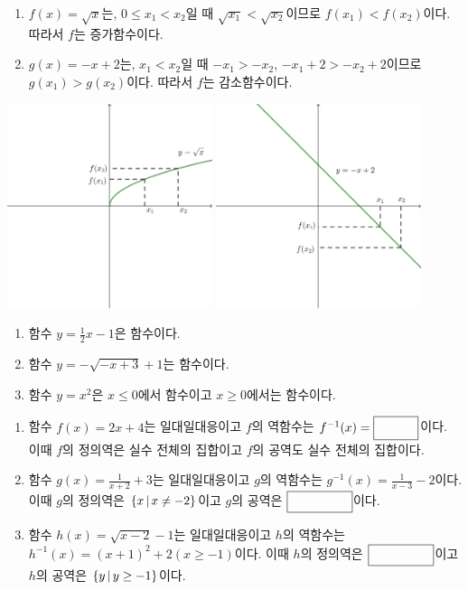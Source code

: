 \documentclass{oblivoir}
\begin{document}
%
\exam{}
\begin{enumerate}\label{review6}
\item
\(f(x)=\sqrt x\)는, \(0\le x_1<x_2\)일 때 \(\sqrt{x_1}<\sqrt{x_2}\)이므로 \(f(x_1)<f(x_2)\)이다.
따라서 \(f\)는 증가함수이다.
\item
\(g(x)=-x+2\)는, \(x_1<x_2\)일 때 \(-x_1>-x_2\), \(-x_1+2>-x_2+2\)이므로 \(g(x_1)>g(x_2)\)이다.
따라서 \(f\)는 감소함수이다.
\end{enumerate}
\begin{center}
\includegraphics[width=0.45\textwidth]{review_6-1}
\quad
\includegraphics[width=0.45\textwidth]{review_6-2}
\end{center}

%
\begin{enumerate}\label{review7}
\item
함수 \(y=\frac12x-1\)은 함수이다.
\item
함수 \(y=-\sqrt{-x+3}+1\)는 함수이다.
\item
함수 \(y=x^2\)은 \(x\le0\)에서 함수이고 \(x\ge0\)에서는 함수이다.
\end{enumerate}

\newpage
%
\begin{enumerate}\label{review8}
\item
함수 \(f(x)=2x+4\)는 일대일대응이고 \(f\)의 역함수는 \(f^{-1}(x)=\pb{\frac12x-2}\)이다.
이때 \(f\)의 정의역은 실수 전체의 집합이고 \(f\)의 공역도 실수 전체의 집합이다.
\item
함수 \(g(x)=\frac1{x+2}+3\)는 일대일대응이고 \(g\)의 역함수는 \(g^{-1}(x)=\frac1{x-3}-2\)이다.
이때 \(g\)의 정의역은 \(\{x\,|\, x\neq-2\}\)이고 \(g\)의 공역은 \(\pb{\{y\ba y\neq3\}}\)이다.
\item
함수 \(h(x)=\sqrt{x-2}-1\)는 일대일대응이고 \(h\)의 역함수는\\ \(h^{-1}(x)=(x+1)^2+2(x\ge-1)\)이다.
이때 \(h\)의 정의역은 \(\pb{\{x\ba x\ge2\}}\)이고 \(h\)의 공역은 \(\{y\,|\, y\ge-1\}\)이다.
\end{enumerate}
\end{document}
